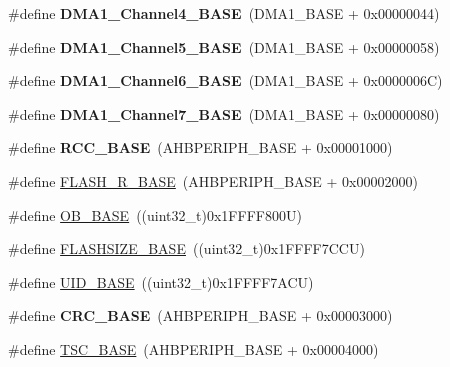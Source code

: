 \begin{DoxyCompactItemize}
\#define {\bfseries D\+M\+A1\+\_\+\+Channel4\+\_\+\+B\+A\+SE}~(D\+M\+A1\+\_\+\+B\+A\+SE + 0x00000044)
\item 
\mbox{\label{group___peripheral__memory__map_gac041a71cd6c1973964f847a68aa14478}} 
\#define {\bfseries D\+M\+A1\+\_\+\+Channel5\+\_\+\+B\+A\+SE}~(D\+M\+A1\+\_\+\+B\+A\+SE + 0x00000058)
\item 
\mbox{\label{group___peripheral__memory__map_ga896c2c7585dd8bc3969cf8561f689d2d}} 
\#define {\bfseries D\+M\+A1\+\_\+\+Channel6\+\_\+\+B\+A\+SE}~(D\+M\+A1\+\_\+\+B\+A\+SE + 0x0000006\+C)
\item 
\mbox{\label{group___peripheral__memory__map_gaeee0d1f77d0db1db533016a09351166c}} 
\#define {\bfseries D\+M\+A1\+\_\+\+Channel7\+\_\+\+B\+A\+SE}~(D\+M\+A1\+\_\+\+B\+A\+SE + 0x00000080)
\item 
\mbox{\label{group___peripheral__memory__map_ga0e681b03f364532055d88f63fec0d99d}} 
\#define {\bfseries R\+C\+C\+\_\+\+B\+A\+SE}~(A\+H\+B\+P\+E\+R\+I\+P\+H\+\_\+\+B\+A\+SE + 0x00001000)
\item 
\#define \hyperlink{group___peripheral__memory__map_ga8e21f4845015730c5731763169ec0e9b}{F\+L\+A\+S\+H\+\_\+\+R\+\_\+\+B\+A\+SE}~(A\+H\+B\+P\+E\+R\+I\+P\+H\+\_\+\+B\+A\+SE + 0x00002000)
\item 
\#define \hyperlink{group___peripheral__memory__map_gab5b5fb155f9ee15dfb6d757da1adc926}{O\+B\+\_\+\+B\+A\+SE}~((uint32\+\_\+t)0x1\+F\+F\+F\+F800\+U)
\item 
\#define \hyperlink{group___peripheral__memory__map_ga776d985f2d4d40b588ef6ca9d573af78}{F\+L\+A\+S\+H\+S\+I\+Z\+E\+\_\+\+B\+A\+SE}~((uint32\+\_\+t)0x1\+F\+F\+F\+F7\+C\+C\+U)
\item 
\#define \hyperlink{group___peripheral__memory__map_ga664eda42b83c919b153b07b23348be67}{U\+I\+D\+\_\+\+B\+A\+SE}~((uint32\+\_\+t)0x1\+F\+F\+F\+F7\+A\+C\+U)
\item 
\mbox{\label{group___peripheral__memory__map_ga656a447589e785594cbf2f45c835ad7e}} 
\#define {\bfseries C\+R\+C\+\_\+\+B\+A\+SE}~(A\+H\+B\+P\+E\+R\+I\+P\+H\+\_\+\+B\+A\+SE + 0x00003000)
\item 
\#define \hyperlink{group___peripheral__memory__map_ga2bba7a31caeacaacd433abb71781e0af}{T\+S\+C\+\_\+\+B\+A\+SE}~(A\+H\+B\+P\+E\+R\+I\+P\+H\+\_\+\+B\+A\+SE + 0x00004000)

\end{DoxyCompactItemize}
